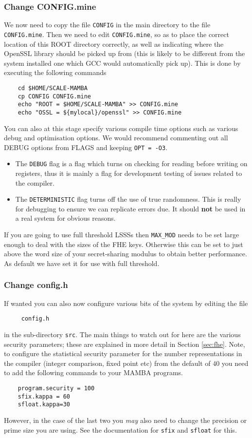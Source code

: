 \subsubsection{Change CONFIG.mine}
We now need to copy the file \verb+CONFIG+ in the main directory to the file
\verb+CONFIG.mine+.
Then we need to edit \verb+CONFIG.mine+, so as to place the correct
location of this ROOT directory correctly, 
as well as indicating where the OpenSSL library should be picked up 
from (this is likely to be different from the
system installed one which GCC would automatically pick up).
This is done by executing the following commands
\begin{verbatim}
    cd $HOME/SCALE-MAMBA
    cp CONFIG CONFIG.mine
    echo "ROOT = $HOME/SCALE-MAMBA" >> CONFIG.mine
    echo "OSSL = ${mylocal}/openssl" >> CONFIG.mine
\end{verbatim}
You can also at this stage specify various compile time options
such as various debug and optimisation options.
We would recommend commenting out all DEBUG options from FLAGS
and keeping \verb+OPT = -O3+.
\begin{itemize}
\item The \verb+DEBUG+ flag is a flag which turns on checking for 
reading before writing on registers, thus it is mainly a flag
for development testing of issues related to the compiler.
\item The \verb+DETERMINISTIC+ flag turns off the use of true randomness.
This is really for debugging to ensure we can replicate errors due.
It should {\bf not} be used in a real system for obvious reasons.
\end{itemize}
If you are going to use full threshold LSSSs then \verb+MAX_MOD+
needs to be set large enough to deal with the sizes of the FHE
keys. Otherwise this can be set to just above the word size of your
secret-sharing modulus to obtain better performance.
As default we have set it for use with full threshold.

\subsubsection{Change config.h}
If wanted you can also now configure various bits of the system
by editing the file
\begin{verbatim}
     config.h
\end{verbatim}
in the sub-directory \verb+src+.
The main things to watch out for here are the various security parameters;
these are explained in more detail in Section \ref{sec:fhe}.
Note, to configure the statistical security parameter for the number representations
in the compiler (integer comparison, fixed point etc) from the default
of $40$ you need to add the following commands to your MAMBA programs.
\begin{verbatim}
    program.security = 100
    sfix.kappa = 60
    sfloat.kappa=30
\end{verbatim}
However, in the case of the last two you {\em may} also need to change the
precision or prime size you are using. See the documentation for
\verb+sfix+ and \verb+sfloat+ for this.

